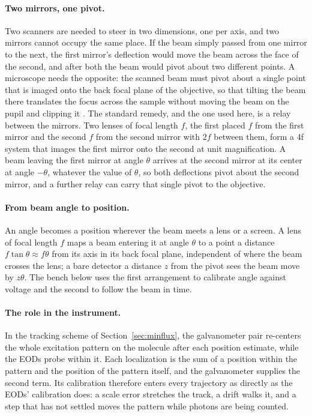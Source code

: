 \documentclass{article}
\begin{document}
\paragraph{Two mirrors, one pivot.}
Two scanners are needed to steer in two dimensions, one per axis, and two mirrors cannot occupy
the same place. If the beam simply passed from one mirror to the next, the first mirror's
deflection would move the beam across the face of the second, and after both the beam would
pivot about two different points. A microscope needs the opposite: the scanned beam must pivot
about a single point that is imaged onto the back focal plane of the objective, so that tilting
the beam there translates the focus across the sample without moving the beam on the pupil and
clipping it \cite{pawleyHandbookBiologicalConfocal2006}. The standard remedy, and the one used
here, is a relay between the mirrors. Two lenses of focal length $f$, the first placed $f$ from
the first mirror and the second $f$ from the second mirror with $2f$ between them, form a 4f
system that images the first mirror onto the second at unit magnification. A beam leaving the first
mirror at angle $\theta$ arrives at the second mirror at its center at angle $-\theta$, whatever the
value of $\theta$, so both deflections pivot about the second mirror, and a further relay can carry
that single pivot to the objective.

\paragraph{From beam angle to position.}
An angle becomes a position wherever the beam meets a lens or a screen. A lens of focal length
$f$ maps a beam entering it at angle $\theta$ to a point a distance $f\tan\theta \approx f\theta$
from its axis in its back focal plane, independent of where the beam crosses the lens; a bare
detector a distance $z$ from the pivot sees the beam move by $z\theta$. The bench below uses the
first arrangement to calibrate angle against voltage and the second to follow the beam in time.

\paragraph{The role in the instrument.}
In the tracking scheme of Section~\ref{sec:minflux}, the galvanometer pair re-centers the whole
excitation pattern on the molecule after each position estimate, while the EODs probe within
it. Each localization is the sum of a position within the pattern and the position of the pattern
itself, and the galvanometer supplies the second term. Its calibration therefore enters every
trajectory as directly as the EODs' calibration does: a scale error stretches the track, a
drift walks it, and a step that has not settled moves the pattern while photons are being counted.
\end{document}
